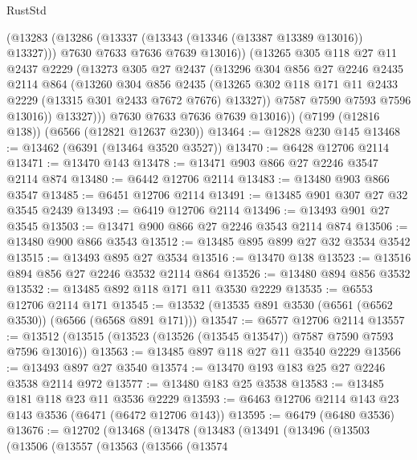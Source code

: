 \begin{lexlean}{RustStd}
\begin{coremodule}
              (@13283
                (@13286 (@13337 (@13343 (@13346 (@13387 @13389 @13016)) @13327)))
                @7630
                @7633
                @7636
                @7639
                @13016))
            (@13265
              @305
              @118
              @27
              @11
              @2437
              @2229
              (@13273
                @305
                @27
                @2437
                (@13296
                  @304
                  @856
                  @27
                  @2246
                  @2435
                  @2114
                  @864
                  (@13260
                    @304
                    @856
                    @2435
                    (@13265 @302 @118 @171 @11 @2433 @2229 (@13315 @301 @2433 @7672 @7676) @13327))
                  @7587
                  @7590
                  @7593
                  @7596
                  @13016))
              @13327)))
        @7630
        @7633
        @7636
        @7639
        @13016))
    (@7199 (@12816 @138))
    (@6566 (@12821 @12637 @230))
@13464 := @12828 @230 @145
@13468 := @13462 (@6391 (@13464 @3520 @3527))
@13470 := @6428 @12706 @2114
@13471 := @13470 @143
@13478 := @13471 @903 @866 @27 @2246 @3547 @2114 @874
@13480 := @6442 @12706 @2114
@13483 := @13480 @903 @866 @3547
@13485 := @6451 @12706 @2114
@13491 := @13485 @901 @307 @27 @32 @3545 @2439
@13493 := @6419 @12706 @2114
@13496 := @13493 @901 @27 @3545
@13503 := @13471 @900 @866 @27 @2246 @3543 @2114 @874
@13506 := @13480 @900 @866 @3543
@13512 := @13485 @895 @899 @27 @32 @3534 @3542
@13515 := @13493 @895 @27 @3534
@13516 := @13470 @138
@13523 := @13516 @894 @856 @27 @2246 @3532 @2114 @864
@13526 := @13480 @894 @856 @3532
@13532 := @13485 @892 @118 @171 @11 @3530 @2229
@13535 := @6553 @12706 @2114 @171
@13545 := @13532 (@13535 @891 @3530 (@6561 (@6562 @3530)) (@6566 (@6568 @891 @171)))
@13547 := @6577 @12706 @2114
@13557 := @13512 (@13515 (@13523 (@13526 (@13545 @13547)) @7587 @7590 @7593 @7596 @13016))
@13563 := @13485 @897 @118 @27 @11 @3540 @2229
@13566 := @13493 @897 @27 @3540
@13574 := @13470 @193 @183 @25 @27 @2246 @3538 @2114 @972
@13577 := @13480 @183 @25 @3538
@13583 := @13485 @181 @118 @23 @11 @3536 @2229
@13593 := @6463 @12706 @2114 @143 @23 @143 @3536 (@6471 (@6472 @12706 @143))
@13595 := @6479 (@6480 @3536)
@13676 := @12702
    (@13468
      (@13478
        (@13483
          (@13491
            (@13496
              (@13503
                (@13506
                  (@13557
                    (@13563
                      (@13566
                        (@13574

\end{coremodule}
\end{lexlean}

